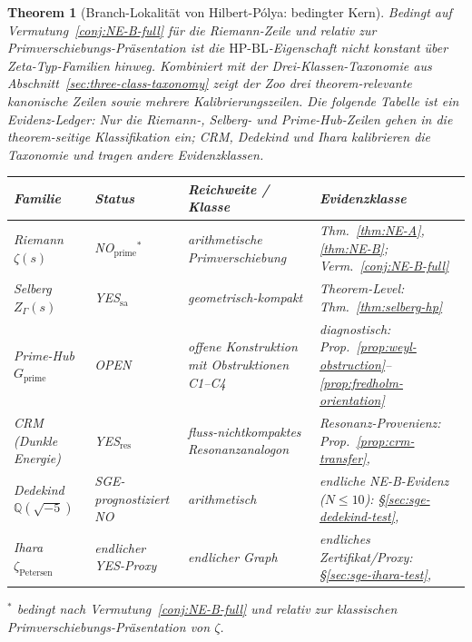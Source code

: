 \documentclass[11pt]{article}
\newtheorem{theorem}{Theorem}[section]
\theoremstyle{definition}
\theoremstyle{remark}
\newcommand{\HBL}{\mathrm{HP\text{-}BL}}
\begin{document}
\begin{theorem}[Branch-Lokalität von Hilbert-P\'olya: bedingter Kern]\label{thm:boundary}
Bedingt auf Vermutung~\ref{conj:NE-B-full} für die Riemann-Zeile und relativ
zur Primverschiebungs-Präsentation ist die $\HBL$-Eigenschaft nicht konstant
über Zeta-Typ-Familien hinweg. Kombiniert mit der Drei-Klassen-Taxonomie aus
Abschnitt~\ref{sec:three-class-taxonomy} zeigt der Zoo drei
theorem-relevante kanonische Zeilen sowie mehrere Kalibrierungszeilen. Die
folgende Tabelle ist ein Evidenz-Ledger: Nur die Riemann-, Selberg- und
Prime-Hub-Zeilen gehen in die theorem-seitige Klassifikation ein; CRM,
Dedekind und Ihara kalibrieren die Taxonomie und tragen andere Evidenzklassen.

\begin{center}
\renewcommand{\arraystretch}{1.15}
\begin{tabular}{@{}>{\raggedright\arraybackslash}p{}
                  >{\raggedright\arraybackslash}p{}
                  >{\raggedright\arraybackslash}p{}
                  >{\raggedright\arraybackslash}p{}@{}}
\toprule
Familie & Status & Reichweite / Klasse & Evidenzklasse \\
\midrule
Riemann $\zeta(s)$ & NO${}_{\mathrm{prime}}{}^*$ &
  arithmetische Primverschiebung &
  Thm.~\ref{thm:NE-A}, \ref{thm:NE-B}; Verm.~\ref{conj:NE-B-full} \\
Selberg $Z_\Gamma(s)$ & YES$_{\mathrm{sa}}$ &
  geometrisch-kompakt & Theorem-Level: Thm.~\ref{thm:selberg-hp} \\
Prime-Hub $G_\mathrm{prime}$ & OPEN &
  offene Konstruktion mit Obstruktionen C1--C4 &
  diagnostisch: Prop.~\ref{prop:weyl-obstruction}--\ref{prop:fredholm-orientation} \\
CRM (Dunkle Energie) & YES$_{\mathrm{res}}$ &
  fluss-nichtkompaktes Resonanzanalogon &
  Resonanz-Provenienz: Prop.~\ref{prop:crm-transfer}, \cite{DyatlovZworski2019} \\
Dedekind $\mathbb{Q}(\sqrt{-5})$ & SGE-prognostiziert NO &
  arithmetisch & endliche NE-B-Evidenz ($N\leq 10$):
  \S\ref{sec:sge-dedekind-test}, \cite{DedekindNEBTest} \\
Ihara $\zeta_{\text{Petersen}}$ & endlicher YES-Proxy &
  endlicher Graph & endliches Zertifikat/Proxy:
  \S\ref{sec:sge-ihara-test}, \cite{IharaPetersenTest} \\
\bottomrule
\end{tabular}
\end{center}
${}^*$ bedingt nach Vermutung~\ref{conj:NE-B-full} und relativ zur
klassischen Primverschiebungs-Präsentation von $\zeta$.
\end{theorem}
\end{document}
